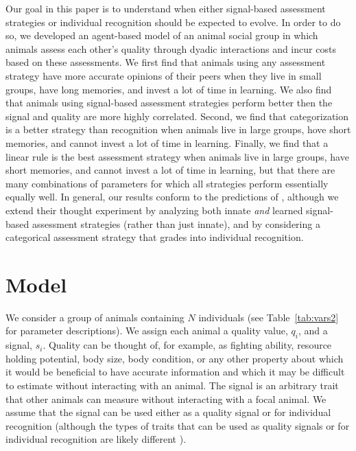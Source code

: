 Our goal in this paper is to understand when either signal-based assessment strategies or individual recognition should be expected to evolve.  In order to do so, we developed an agent-based model of an animal social group in which animals assess each other's quality through dyadic interactions and incur costs based on these assessments. We first find that animals using any assessment strategy have more accurate opinions of their peers when they live in small groups, have long memories, and invest a lot of time in learning. We also find that animals using signal-based assessment strategies perform better then the signal and quality are more highly correlated. Second, we find that categorization is a better strategy than recognition when animals live in large groups, hove short memories, and cannot invest a lot of time in learning. Finally, we find that a linear rule is the best assessment strategy when animals live in large groups, have short memories, and cannot invest a lot of time in learning, but that there are many combinations of parameters for which all strategies perform essentially equally well. In general, our results conform to the predictions of \citet{sheehan2016evotradeoff}, although we extend their thought experiment by analyzing both innate \emph{and} learned signal-based assessment strategies (rather than just innate), and by considering a categorical assessment strategy that grades into individual recognition. 
 

\section*{Model } 

We consider a group of animals containing $N$ individuals (see Table~\ref{tab:vars2} for parameter descriptions). We assign each animal a quality value, $q_i$, and a signal, $s_i$. Quality can be thought of, for example, as fighting ability, resource holding potential, body size, body condition, or any other property about which it would be beneficial to have accurate information and which it may be difficult to estimate without interacting with an animal. The signal is an arbitrary trait that other animals can measure without interacting with a focal animal.  We assume that the signal can be used either as a quality signal or for individual recognition (although the types of traits that can be used  as quality signals or for individual recognition are likely different \citep{Dale:2001dv}).

